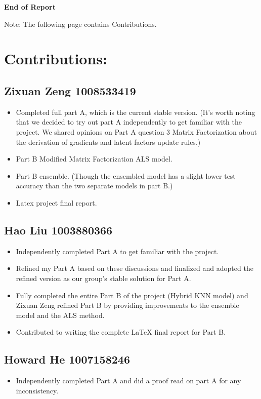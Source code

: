 \documentclass{article}
\begin{document}
\vspace*{5cm}
\begin{center}
\Large\bfseries End of Report
\end{center}
Note: The following page contains Contributions.


\newpage
\section*{Contributions:}
\subsection*{Zixuan Zeng 1008533419}
\begin{itemize}
    \item Completed full part A, which is the current stable version.\newline
    (It's worth noting that we decided to try out part A independently to get familiar with the project. We shared opinions on Part A question 3 Matrix Factorization about the derivation of gradients and latent factors update rules.)
    \item Part B Modified Matrix Factorization ALS model.
    \item Part B ensemble.
    (Though the ensembled model has a slight lower test accuracy than the two separate models in part B.)
    \item Latex project final report.
\end{itemize}
\subsection*{Hao Liu 1003880366}
\begin{itemize}
    \item Independently completed Part A to get familiar with the project.
    \item Refined my Part A based on these discussions and finalized and adopted the refined version as our group's stable solution for Part A.
    \item Fully completed the entire Part B of the project (Hybrid KNN model) and Zixuan Zeng refined Part B by providing improvements to the ensemble model and the ALS method.
    \item Contributed to writing the complete LaTeX final report for Part B.
\end{itemize}
\subsection*{Howard He 1007158246}
\begin{itemize}
    \item Independently completed Part A and did a proof read on part A for any inconsistency.
\end{itemize}
\end{document}
